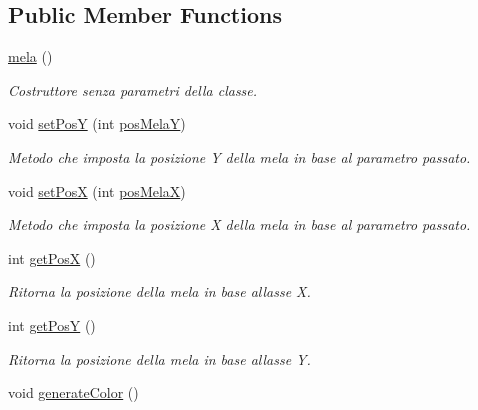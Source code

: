 \subsection*{Public Member Functions}
\begin{DoxyCompactItemize}
\item 
\mbox{\hyperlink{class_snake_1_1game_1_1vipera_1_1mela_ac294a8928f164db9f4c965b86409b4df}{mela}} ()
\begin{DoxyCompactList}\small\item\em Costruttore senza parametri della classe. \end{DoxyCompactList}\item 
void \mbox{\hyperlink{class_snake_1_1game_1_1vipera_1_1mela_abb7df6a3b7f27271ff796f1b39d5b800}{set\+PosY}} (int \mbox{\hyperlink{class_snake_1_1game_1_1vipera_1_1mela_ac5c78730de1bfb90e34ab5381ea70878}{pos\+MelaY}})
\begin{DoxyCompactList}\small\item\em Metodo che imposta la posizione Y della mela in base al parametro passato. \end{DoxyCompactList}\item 
void \mbox{\hyperlink{class_snake_1_1game_1_1vipera_1_1mela_aa5a2e0c6f2b05d50ca35ca417d298363}{set\+PosX}} (int \mbox{\hyperlink{class_snake_1_1game_1_1vipera_1_1mela_a18097b5636ab8e5eaf99d18ffa609a06}{pos\+MelaX}})
\begin{DoxyCompactList}\small\item\em Metodo che imposta la posizione X della mela in base al parametro passato. \end{DoxyCompactList}\item 
int \mbox{\hyperlink{class_snake_1_1game_1_1vipera_1_1mela_a59a95eee3790a91a574ac018208b6044}{get\+PosX}} ()
\begin{DoxyCompactList}\small\item\em Ritorna la posizione della mela in base all\textquotesingle{}asse X. \end{DoxyCompactList}\item 
int \mbox{\hyperlink{class_snake_1_1game_1_1vipera_1_1mela_a3388b2d66cc794258707674f20766a7f}{get\+PosY}} ()
\begin{DoxyCompactList}\small\item\em Ritorna la posizione della mela in base all\textquotesingle{}asse Y. \end{DoxyCompactList}\item 
void \mbox{\hyperlink{class_snake_1_1game_1_1vipera_1_1mela_a4f720f425b921900de19e238bcd0457a}{generate\+Color}} ()

\end{DoxyCompactItemize}
